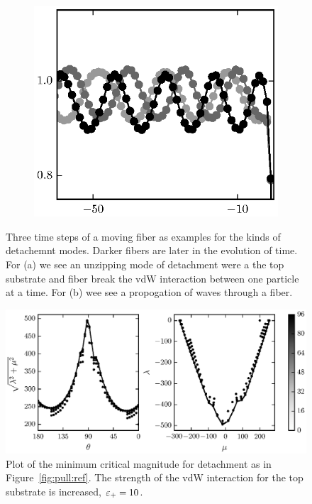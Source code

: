 {\begin{figure}[t]
\begin{subfigure}{.5\textwidth}
         \includegraphics{./fig/ch3/pull/wave_anim.eps}
         \caption{\label{subfig:travel_waves}}
      \end{subfigure}
      \caption{Three time steps of a moving fiber as examples for the kinds of detachemnt modes. Darker fibers are later in the evolution of time. For (a) we see an unzipping mode of detachment were a the top substrate and fiber break the vdW interaction between one particle at a time. For (b) wee see a propogation of waves through a fiber.\label{fig:animation}}  
   \end{figure}

   \begin{figure}[t]
      \begin{center}
         \includegraphics{./fig/ch3/pull/et10/grid.eps}
      \end{center}      
      \caption{Plot of the minimum critical magnitude for detachment as in Figure~\ref{fig:pull:ref}. The strength of the vdW interaction for the top substrate is increased, $\varepsilon_+=10$.
      \label{fig:pull:et10}}
   \end{figure}

}

